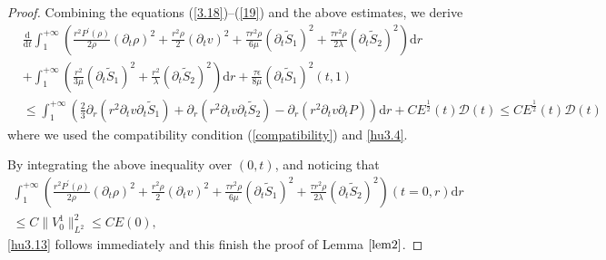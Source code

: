 \documentclass[10pt,reqno]{amsart}
\numberwithin{equation}{section}
\begin{document}
\begin{proof}
		Combining the equations (\ref{3.18})--(\ref{19}) and the above estimates, we derive
		\begin{equation}\label{order-1-t}
			\begin{aligned}
				&\frac{\mathrm{d}}{\mathrm{d} t} \int_{1}^{+\infty}\left(\frac{r^2 P^{\prime}(\rho)}{2\rho} (\partial_{t}\rho)^2+\frac{r^2\rho}{2}(\partial_{t}v)^2
				+\frac{\tau  r^2 \rho}{6 \mu} (\partial_{t}\tilde{S}_1)^2 +\frac{\tau r^2 \rho}{2\lambda} (\partial_{t}\tilde{S}_2)^2\right) \mathrm{d}r\\
				&+\int_{1}^{+\infty}\left(\frac{r^2}{3 \mu}(\partial_t \tilde{S}_1)^2+\frac{r^2}{\lambda}(\partial_t \tilde{S}_2)^2\right)\mathrm{d}r
				+\frac{\tau \epsilon}{8 \mu}(\partial_t\tilde{S}_1)^2(t,1)\\
				&\leq \int_{1}^{+\infty}\left(\frac{2}{3} \partial_r(r^2 \partial_t v \partial_t \tilde{S}_1) 
				+\partial_r(r^2 \partial_t v \partial_t \tilde{S}_2)
				-\partial_r(r^2  \partial_{t}v  \partial_t P)\right)\mathrm{d}r
				+C E^{\frac{1}{2}}(t) \mathcal{D}(t)
				\leq C E^{\frac{1}{2}}(t) \mathcal{D}(t)
			\end{aligned}
		\end{equation}
		where we used the compatibility condition (\ref{compatibility}) and \eqref{hu3.4}. 
		
		By integrating the above inequality over $(0, t)$, and noticing that
		\begin{align*}
			\int_{1}^{+\infty}\left(\frac{r^2 P^{\prime}(\rho)}{2\rho} (\partial_{t}\rho)^2+\frac{r^2\rho}{2}(\partial_{t}v)^2
			+\frac{\tau  r^2 \rho}{6 \mu} (\partial_{t}\tilde{S}_1)^2 +\frac{\tau r^2 \rho}{2\lambda} (\partial_{t}\tilde{S}_2)^2\right) (t=0,r)\mathrm{d}r\\
			\leq C \|V_0^1\|_{L^2}^2\leq C E(0),
		\end{align*}
		\eqref{hu3.13} follows immediately and this finish the proof of  Lemma $\ref{lem2}$.
	\end{proof}
	
\end{document}
